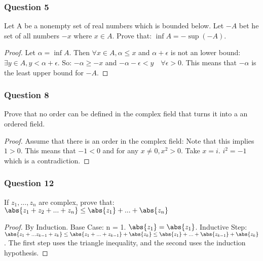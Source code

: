 \documentclass[12pt, letterpaper]{paper}
\begin{document}
\subsubsection{Question 5}
\label{sec:orgfaec5fd}
\begin{question}
  Let A be a nonempty set of real numbers which is bounded below. Let
  $-A$ bet he set of all numbers $-x$ where $x \in A$. Prove that:
  $\inf{A} = - \sup( -A )$.
\end{question}
\begin{proof}
  Let $\alpha = \inf{A}$. Then $\forall x \in A, \alpha \leq x$ and
  $\alpha + \epsilon$ is not an lower bound:
  $\exists y \in A, y < \alpha + \epsilon$.  So: $-\alpha \geq -x$ and
  $-\alpha - \epsilon < y \quad \forall\epsilon > 0$. This means that
  $-\alpha$ is the least upper bound for $-A$.
\end{proof}


\subsubsection{Question 8}
\label{sec:org2ae56a0}
\begin{question}
  Prove that no order can be defined in the complex field that turns
  it into a an ordered field.
\end{question}
\begin{proof}
  Assume that there is an order in the complex field: Note that this
  implies $1 > 0$.  This means that $-1 < 0$ and for any
  $x \neq 0, x^2 > 0$. Take $x = i$. $i^2 = -1$ which is a
  contradiction.
\end{proof}

\subsubsection{Question 12}
\label{sec:org80a6e23}
\begin{question}
  If $z_1 , ... , z_n$ are complex, prove that:
  $\abs{ z_1 + z_2 + ... + z_n } \leq \abs{ z_1 } + ... + \abs{z_n}$
\end{question}
\begin{proof}
  By Induction.  Base Case: n = 1. $\abs{ z_1 } = \abs{z_1}$. \newline
  Inductive Step:
  $\abs{ z_1 + ... z_{k-1} + z_k } \leq \abs{ z_1 + ... + z_{k-1} } +
  \abs{z_k } \leq \abs{ z_1 } + ... + \abs{ z_{k-1} } + \abs{z_k}$.
  The first step uses the triangle inequality, and the second uses the
  induction hypothesis.
\end{proof}
\end{document}
